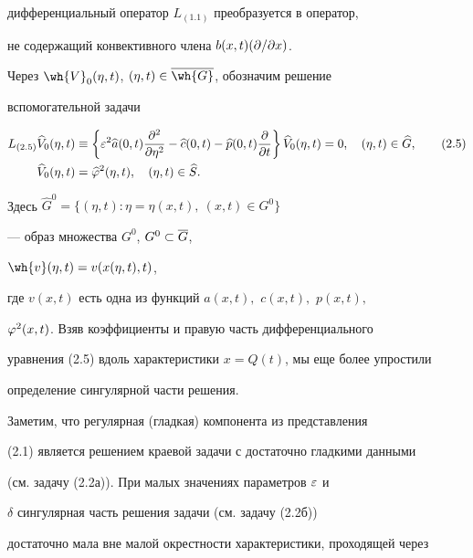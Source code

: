 дифференциальный оператор $L_{(1.1)}$ преобразуется в оператор, 


не содержащий конвективного члена \(b(x,t)(\partial / \partial x)\).





Через $\wh{V}_0(\eta,t)$, $(\eta,t)\in\ovl{\wh{G}}$, обозначим решение


вспомогательной задачи 


\begin{align} \label{2.5}


L_{(2.5)}\widehat{V}_0(\eta,t) &\equiv \left\{\eps^2\widehat{a}(0,t)


\frac{\pa^2}{\pa\eta^2}-\widehat{c}(0,t)-


\widehat{p}(0, t)\frac{\pa}{\pa t}


\right\}\widehat{V}_0(\eta,t)=0,\quad 


(\eta,t)\in\widehat{G},\tag{2.5}\\


\widehat{V}_0(\eta,t)&=\widehat{\vf}^2(\eta,t),\quad 


(\eta,t)\in \widehat{S}.\notag


\end{align}


Здесь $\widehat{G}^0=\{(\eta,t):\eta=\eta(x,t),\ (x,t)\in G^0\}$ 


--- образ множества $G^0$, $G^0\subset \overline{G}$,


$\wh{v}(\eta,t)=v(x(\eta,t),t)$,


где $v(x,t)$ есть одна из функций $a(x,t),$ $c(x,t),$ $p(x,t),$


$\varphi^2(x,t)$. Взяв коэффициенты и правую часть дифференциального 


уравнения (2.5) вдоль характеристики $x=Q(t)$, мы еще более упростили


определение сингулярной части решения.





Заметим, что регулярная (гладкая) компонента из представления 


(2.1) является решением краевой задачи с достаточно гладкими данными


(см. задачу (2.2а)). При малых значениях параметров $\varepsilon$ и 


$\delta$ сингулярная часть решения задачи (см. задачу (2.2б)) 


достаточно мала вне малой окрестности характеристики, проходящей через


